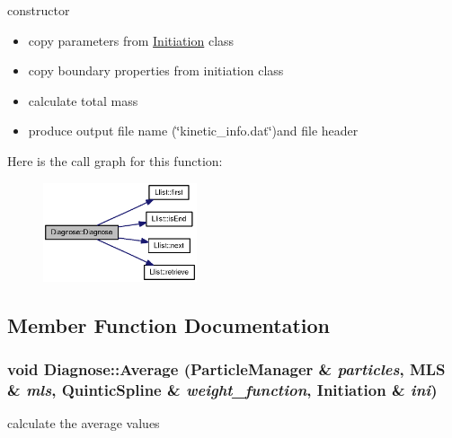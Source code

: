 constructor 



\begin{itemize}
\item copy parameters from \hyperlink{classInitiation}{Initiation} class

\item copy boundary properties from initiation class

\item calculate total mass

\item produce output file name (\char`\"{}kinetic\_\-info.dat\char`\"{})and file header \end{itemize}


Here is the call graph for this function:\nopagebreak
\begin{figure}[H]
\begin{center}
\leavevmode
\includegraphics[width=128pt]{classDiagnose_915a3d571504c843748bf5e9a9ec801c_cgraph}
\end{center}
\end{figure}


\subsection{Member Function Documentation}
\hypertarget{classDiagnose_8c14b3fa58083f64be2018bd0462604d}{
\subsubsection[{Average}]{\setlength{\rightskip}{0pt plus 5cm}void Diagnose::Average ({\bf ParticleManager} \& {\em particles}, \/  {\bf MLS} \& {\em mls}, \/  {\bf QuinticSpline} \& {\em weight\_\-function}, \/  {\bf Initiation} \& {\em ini})}}
\label{classDiagnose_8c14b3fa58083f64be2018bd0462604d}


calculate the average values 



